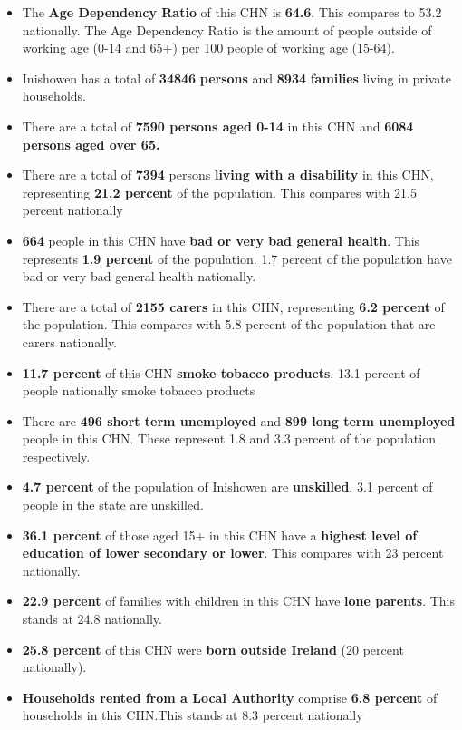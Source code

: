 \documentclass{article}
\begin{document}
\begin{itemize}

\item The \textbf{Age Dependency Ratio} of this CHN is  \textbf{64.6}. This compares to 53.2 nationally. The Age Dependency Ratio is the amount of people outside of working age (0-14 and 65+) per 100 people of working age (15-64). 

\item Inishowen has a total of \textbf{\num{34846}} \textbf{persons} and  \textbf{\num{8934}} \textbf{families} living in private households.

\item There are a total of \textbf{\num{7590} persons aged 0-14} in this CHN and \textbf{\num{6084} persons aged over 65.} 

\item There are a total of \textbf{\num{7394}} persons \textbf{living with a disability} in this CHN, representing \textbf{21.2 percent} of the population. This compares with  21.5 percent nationally

\item \textbf{\num{664}} people in this CHN have \textbf{bad or very bad general health}. This represents \textbf{1.9 percent} of the population. 1.7 percent of the population have bad or very bad general health nationally. 

\item There are a total of \textbf{\num{2155} carers} in this CHN, representing \textbf{6.2 percent} of the population. This compares with 5.8 percent of the population that are carers nationally. 

\item \textbf{11.7 percent} of this CHN \textbf{smoke tobacco products}. 13.1 percent of people nationally smoke tobacco products

\item There are \textbf{\num{496} short term unemployed} and \textbf{\num{899} long term unemployed} people in this CHN. These represent 1.8 and 3.3 percent of the population respectively.

\item  \textbf{4.7 percent} of the population of Inishowen are \textbf{unskilled}. 3.1 percent of people in the state are unskilled.

\item \textbf{36.1 percent} of those aged 15+ in this CHN have a \textbf{highest level of education of lower secondary or lower}. This compares with 23 percent nationally. 

\item \textbf{22.9 percent} of families with children in this CHN have \textbf{lone parents}. This stands at 24.8 nationally.

\item \textbf{25.8 percent} of this CHN were \textbf{born outside Ireland} (20 percent nationally).

\item \textbf{Households rented from a Local Authority} comprise \textbf{6.8 percent} of households in this CHN.This stands at 8.3 percent nationally

\end{itemize}
\end{document}
